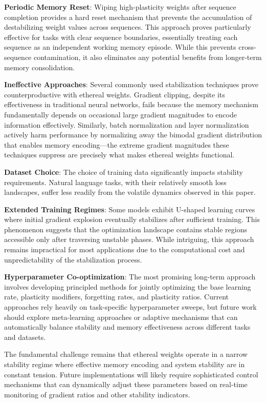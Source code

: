 \documentclass{article} %
\begin{document}
\textbf{Periodic Memory Reset}: Wiping high-plasticity weights after sequence completion provides a hard reset mechanism that prevents the accumulation of destabilizing weight values across sequences. This approach proves particularly effective for tasks with clear sequence boundaries, essentially treating each sequence as an independent working memory episode. While this prevents cross-sequence contamination, it also eliminates any potential benefits from longer-term memory consolidation.

\textbf{Ineffective Approaches}: Several commonly used stabilization techniques prove counterproductive with ethereal weights. Gradient clipping, despite its effectiveness in traditional neural networks, fails because the memory mechanism fundamentally depends on occasional large gradient magnitudes to encode information effectively. Similarly, batch normalization and layer normalization actively harm performance by normalizing away the bimodal gradient distribution that enables memory encoding—the extreme gradient magnitudes these techniques suppress are precisely what makes ethereal weights functional.

\textbf{Dataset Choice}: The choice of training data significantly impacts stability requirements. Natural language tasks, with their relatively smooth loss landscapes, suffer less readily from the volatile dynamics observed in this paper. 

\textbf{Extended Training Regimes}: Some models exhibit U-shaped learning curves where initial gradient explosion eventually stabilizes after sufficient training. This phenomenon suggests that the optimization landscape contains stable regions accessible only after traversing unstable phases. While intriguing, this approach remains impractical for most applications due to the computational cost and unpredictability of the stabilization process.

\textbf{Hyperparameter Co-optimization}: The most promising long-term approach involves developing principled methods for jointly optimizing the base learning rate, plasticity modifiers, forgetting rates, and plasticity ratios. Current approaches rely heavily on task-specific hyperparameter sweeps, but future work should explore meta-learning approaches or adaptive mechanisms that can automatically balance stability and memory effectiveness across different tasks and datasets.

The fundamental challenge remains that ethereal weights operate in a narrow stability regime where effective memory encoding and system stability are in constant tension. Future implementations will likely require sophisticated control mechanisms that can dynamically adjust these parameters based on real-time monitoring of gradient ratios and other stability indicators.
\end{document}

